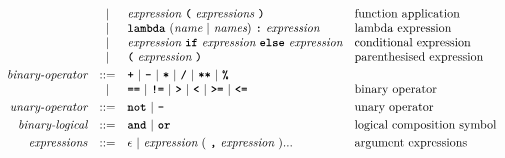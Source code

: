 \[\begin{array}{rcll}
                         & |   & \textit{expression}\ \textbf{\texttt{(}}\ \textit{expressions}\ \textbf{\texttt{)}}                           & \text{function application}             \\
                         & |   & \textbf{\texttt{lambda}}\ (\textit{name}\ |\ \textit{names})\ \textbf{\texttt{:}}\ \textit{expression}        & \text{lambda expression}                \\
                         & |   & \textit{expression}\ \textbf{\texttt{if}}\ \textit{expression}\ \textbf{\texttt{else}}\ \textit{expression}   & \text{conditional expression}           \\
                         & |   & \textbf{\texttt{(}}\ \textit{expression}\ \textbf{\texttt{)}}                                                 & \text{parenthesised expression}         \\[1mm]
\textit{binary-operator} & ::= & \textbf{\texttt{+}}\ |\ \textbf{\texttt{-}}\ |\ \textbf{\texttt{*}}\ |\ \textbf{\texttt{/}}\ |\ \textbf{\texttt{**}}\ |\ \textbf{\texttt{\%}}             &                                         \\
                         & |   & \textbf{\texttt{==}}\ |\ \textbf{\texttt{!=}}\ |\ \textbf{\texttt{>}}\ |\ \textbf{\texttt{<}}\ |\ \textbf{\texttt{>=}}\ |\ \textbf{\texttt{<=}}           & \text{binary operator}                  \\[1mm]
\textit{unary-operator}  & ::= & \textbf{\texttt{not}}\ |\ \textbf{\texttt{-}}                                                                 & \text{unary operator}                   \\[1mm]
\textit{binary-logical}  & ::= & \textbf{\texttt{and}}\ |\ \textbf{\texttt{or}}                                                                & \text{logical composition symbol}       \\[1mm]
\textit{expressions}     & ::= & \epsilon\ |\ \textit{expression}\ (\ \textbf{\texttt{,}}\ \textit{expression}\ )...                & \text{argument expressions}             \\

\end{array}\]
